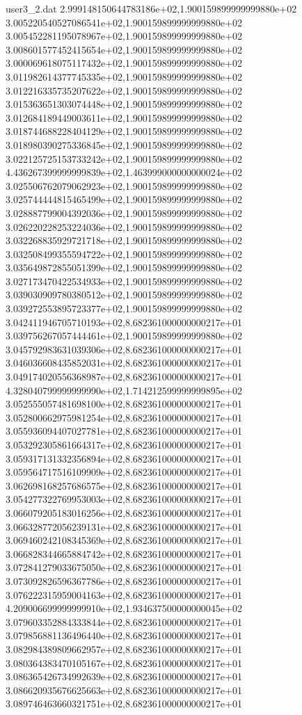 \begin{filecontents}{user3_2.dat}
2.999148150644783186e+02,1.900159899999999880e+02
3.005220540527086541e+02,1.900159899999999880e+02
3.005452281195078967e+02,1.900159899999999880e+02
3.008601577452415654e+02,1.900159899999999880e+02
3.000069618075117432e+02,1.900159899999999880e+02
3.011982614377745335e+02,1.900159899999999880e+02
3.012216335735207622e+02,1.900159899999999880e+02
3.015363651303074448e+02,1.900159899999999880e+02
3.012684189449003611e+02,1.900159899999999880e+02
3.018744688228404129e+02,1.900159899999999880e+02
3.018980390275336845e+02,1.900159899999999880e+02
3.022125725153733242e+02,1.900159899999999880e+02
4.436267399999999839e+02,1.463999000000000024e+02
3.025506762079062923e+02,1.900159899999999880e+02
3.025744444815465499e+02,1.900159899999999880e+02
3.028887799004392036e+02,1.900159899999999880e+02
3.026220228253224036e+02,1.900159899999999880e+02
3.032268835929721718e+02,1.900159899999999880e+02
3.032508499355594722e+02,1.900159899999999880e+02
3.035649872855051399e+02,1.900159899999999880e+02
3.027173470422534933e+02,1.900159899999999880e+02
3.039030909780380512e+02,1.900159899999999880e+02
3.039272553895723377e+02,1.900159899999999880e+02
3.042411946705710193e+02,8.682361000000000217e+01
3.039756267057444461e+02,1.900159899999999880e+02
3.045792983631039306e+02,8.682361000000000217e+01
3.046036608435852031e+02,8.682361000000000217e+01
3.049174020556368987e+02,8.682361000000000217e+01
4.328040799999999990e+02,1.714212599999999895e+02
3.052555057481698100e+02,8.682361000000000217e+01
3.052800662975981254e+02,8.682361000000000217e+01
3.055936094407027781e+02,8.682361000000000217e+01
3.053292305861664317e+02,8.682361000000000217e+01
3.059317131332356894e+02,8.682361000000000217e+01
3.059564717516109909e+02,8.682361000000000217e+01
3.062698168257686575e+02,8.682361000000000217e+01
3.054277322769953003e+02,8.682361000000000217e+01
3.066079205183016256e+02,8.682361000000000217e+01
3.066328772056239131e+02,8.682361000000000217e+01
3.069460242108345369e+02,8.682361000000000217e+01
3.066828344665884742e+02,8.682361000000000217e+01
3.072841279033675050e+02,8.682361000000000217e+01
3.073092826596367786e+02,8.682361000000000217e+01
3.076222315959004163e+02,8.682361000000000217e+01
4.209006699999999910e+02,1.934637500000000045e+02
3.079603352884333844e+02,8.682361000000000217e+01
3.079856881136496440e+02,8.682361000000000217e+01
3.082984389809662957e+02,8.682361000000000217e+01
3.080364383470105167e+02,8.682361000000000217e+01
3.086365426734992639e+02,8.682361000000000217e+01
3.086620935676625663e+02,8.682361000000000217e+01
3.089746463660321751e+02,8.682361000000000217e+01

\end{filecontents}
